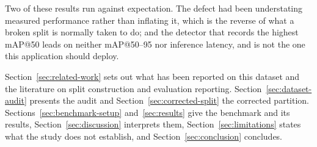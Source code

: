 Two of these results run against expectation. The defect had been understating
measured performance rather than inflating it, which is the reverse of what a
broken split is normally taken to do; and the detector that records the highest
mAP@50 leads on neither mAP@50--95 nor inference latency, and is not the one this
application should deploy.

Section~\ref{sec:related-work} sets out what has been reported on this dataset
and the literature on split construction and evaluation reporting.
Section~\ref{sec:dataset-audit} presents the audit and
Section~\ref{sec:corrected-split} the corrected partition.
Sections~\ref{sec:benchmark-setup} and~\ref{sec:results} give the benchmark and
its results, Section~\ref{sec:discussion} interprets them,
Section~\ref{sec:limitations} states what the study does not establish, and
Section~\ref{sec:conclusion} concludes.
